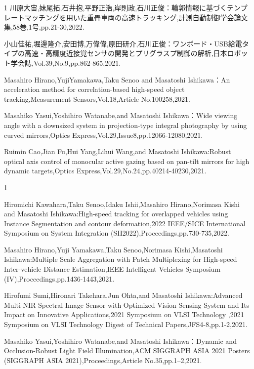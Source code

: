 \begin{雑誌論文}{1}
川原大宙,妹尾拓,石井抱,平野正浩,岸則政,石川正俊：輪郭情報に基づくテンプレートマッチングを用いた重畳車両の高速トラッキング,計測自動制御学会論文集,58巻,1号,pp.21-30,2022.

小山佳祐,堀邊隆介,安田博,万偉偉,原田研介,石川正俊：ワンボード・USB給電タイプの高速・高精度近接覚センサの開発とプリグラスプ制御の解析,日本ロボット学会誌,Vol.39,No.9,pp.862-865,2021.

Masahiro Hirano,YujiYamakawa,Taku Senoo and Masatoshi Ishikawa：An acceleration method for correlation-based high-speed object tracking,Measurement Sensors,Vol.18,Article No.100258,2021.

Masahiko Yasui,Yoshihiro Watanabe,and Masatoshi Ishikawa：Wide viewing angle with a downsized system in projection-type integral photography by using curved mirrors,Optics Express,Vol.29,Issue8,pp.12066-12080,2021.

Ruimin Cao,Jian Fu,Hui Yang,Lihui Wang,and Masatoshi Ishikawa:Robust optical axis control of monocular active gazing based on pan-tilt mirrors for high dynamic targets,Optics Express,Vol.29,No.24,pp.40214-40230,2021.

\end{雑誌論文}

\begin{査読付}{1}

Hiromichi Kawahara,Taku Senoo,Idaku Ishii,Masahiro Hirano,Norimasa Kishi and Masatoshi Ishikawa:High-speed tracking for overlapped vehicles using Instance Segmentation and contour deformation,2022 IEEE/SICE International Symposium on System Integration (SII2022),Proceedings,pp.730-735,2022.

Masahiro Hirano,Yuji Yamakawa,Taku Senoo,Norimasa Kishi,Masatoshi Ishikawa:Multiple Scale Aggregation with Patch Multiplexing for High-speed Inter-vehicle Distance Estimation,IEEE Intelligent Vehicles Symposium (IV),Proceedings,pp.1436-1443,2021.

Hirofumi Sumi,Hironari Takehara,Jun Ohta,and Masatoshi Ishikawa:Advanced Multi-NIR Spectral Image Sensor with Optimized Vision Sensing System and Its Impact on Innovative Applications,2021 Symposium on VLSI Technology ,2021 Symposium on VLSI Technology Digest of Technical Papers,JFS4-8,pp.1-2,2021.

Masahiko Yasui,Yoshihiro Watanabe,and Masatoshi Ishikawa：Dynamic and Occlusion-Robust Light Field Illumination,ACM SIGGRAPH ASIA 2021 Posters (SIGGRAPH ASIA 2021),Proceedings,Article No.35,pp.1–2,2021.

\end{査読付}

